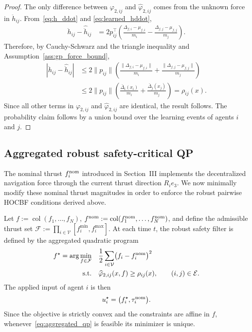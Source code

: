 \documentclass[journal,twoside,web]{ieeecolor}
\begin{document}
\begin{proof}
The only difference between $\varphi_{2,ij}$ and
$\widehat\varphi_{2,ij}$ comes from the unknown force
in $\ddot h_{ij}$. From~\eqref{eq:h_ddot} and
\eqref{eq:learned_hddot},
\[
\begin{aligned}
    \ddot h_{ij}-\widehat{\ddot h}_{ij}
    &=
    2p_{ij}^{\top}
    \left(
        \frac{\Delta_{f,i}-\mu_{f,i}}{m_i}
        -
        \frac{\Delta_{f,j}-\mu_{f,j}}{m_j}
    \right).
\end{aligned}
\]
Therefore, by Cauchy-Schwarz and the triangle inequality and
Assumption~\ref{ass:gp_force_bound},
\[
\begin{aligned}
    \left|
        \ddot h_{ij}
        -
        \widehat{\ddot h}_{ij}
    \right|
    &\leq
    2\|p_{ij}\|
    \left(
        \frac{\|\Delta_{f,i}-\mu_{f,i}\|}{m_i}
        +
        \frac{\|\Delta_{f,j}-\mu_{f,j}\|}{m_j}
    \right)
    \\
    &\leq
    2\|p_{ij}\|
    \left(
        \frac{\bar\Delta_i(x_i)}{m_i}
        +
        \frac{\bar\Delta_j(x_j)}{m_j}
    \right)
    =
    \rho_{ij}(x).
\end{aligned}
\]
Since all other terms in $\varphi_{2,ij}$ and
$\widehat\varphi_{2,ij}$ are identical, the result follows.
The probability claim follows by a union bound over the learning events of agents $i$ and $j$.
\end{proof}

\subsection{Aggregated robust safety-critical QP}
\label{subsec:aggregated_qp}

The nominal thrust $f_i^{\rm nom}$ introduced in
Section~III implements the decentralized navigation force through
the current thrust direction $R_i e_3$. We now minimally modify
these nominal thrust magnitudes in order to enforce the robust
pairwise HOCBF conditions derived above.

Let $f:=\operatorname{col}(f_1,\ldots,f_N)$, $f^{\rm nom}:=
    \operatorname{col}(f_1^{\rm nom},\ldots,f_N^{\rm nom})$, and define the admissible thrust set
$\displaystyle{\mathcal F
    :=
    \prod_{i\in\mathcal V}
    [f_i^{\min},f_i^{\max}]}$. At each time $t$, the robust safety filter is defined by the
aggregated quadratic program
\begin{align}
    f^\star
    =
    \arg\min_{f\in\mathcal F}
    \quad&
    \frac{1}{2}
    \sum_{i\in\mathcal V}
    \bigl(f_i-f_i^{\rm nom}\bigr)^2
    \label{eq:aggregated_qp}
    \\
    \text{s.t.}\quad&
    \widehat\varphi_{2,ij}(x,f)
    \geq
    \rho_{ij}(x),
    \qquad
    (i,j)\in\mathcal E .
    \nonumber
\end{align}
The applied input of agent $i$ is then
\begin{equation}
    u_i^\star
    =
    \bigl(f_i^\star,\tau_i^{\rm nom}\bigr).
    \label{eq:safe_applied_input}
\end{equation} Since the objective is strictly convex and the constraints are
affine in $f$, whenever~\eqref{eq:aggregated_qp} is feasible
its minimizer is unique.
\end{document}
